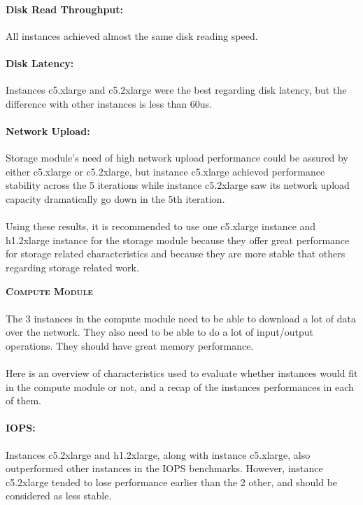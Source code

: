 \documentclass[11pt]{article}
\begin{document}
		\paragraph{Disk Read Throughput:} All instances achieved almost the same
		disk reading speed.

		\paragraph{Disk Latency:} Instances c5.xlarge and c5.2xlarge were the
		best regarding disk latency, but the difference with other instances is
		less than 60us. 

		\paragraph{Network Upload:} Storage module's need of high network upload
		performance could be assured by either c5.xlarge or c5.2xlarge, but
		instance c5.xlarge achieved performance stability across the 5
		iterations while instance c5.2xlarge saw its network upload capacity
		dramatically go down in the 5th iteration.

		\paragraph{} Using these results, it is recommended to use one c5.xlarge
		instance and h1.2xlarge instance for the storage module because they
		offer great performance for storage related characteristics and because
		they are more stable that others regarding storage related work.\bigskip
		
		\textsc{\Large{\textbf{Compute Module}}}

		\paragraph{} The 3 instances in the compute module need
		to be able to download a lot of data over the network. They also need to
		be able to do a lot of input/output operations. They should have great
		memory performance.

		\paragraph{} Here is an overview of characteristics used to evaluate
		whether instances would fit in the compute module or not, and a recap of
		the instances performances in each of them.

		\paragraph{IOPS:} Instances c5.2xlarge and h1.2xlarge, along with
		instance c5.xlarge, also outperformed other instances in the IOPS
		benchmarks. However, instance c5.2xlarge tended to lose performance
		earlier than the 2 other, and should be considered as less stable.
\end{document}

